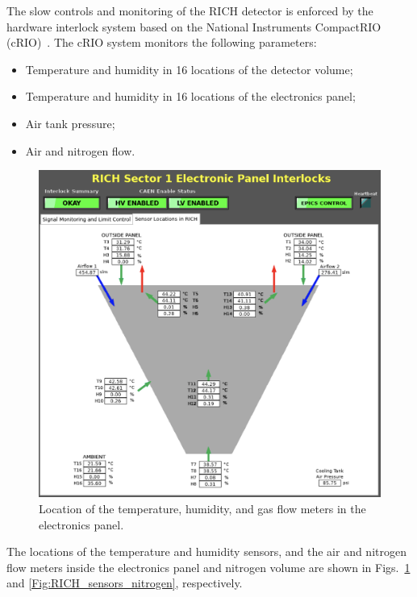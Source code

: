 \documentclass[5p,times,twocolumn]{elsarticle}
\begin{document}
The slow controls and monitoring of the RICH detector is enforced by the hardware interlock system based on the
National Instruments CompactRIO (cRIO)~\cite{Ref:cRIO}.
The cRIO system monitors the following parameters:
\begin{itemize}
\item Temperature and humidity in 16 locations of the detector volume;
\item Temperature and humidity in 16 locations of the electronics panel;
\item Air tank pressure;
\item Air and nitrogen flow. 
\end{itemize}
\begin{figure}
\begin{center}
\includegraphics[width=0.8\columnwidth]{RICH_sensors_e_panel.png}
\end{center}
\caption{Location of the temperature, humidity, and gas flow meters in the electronics panel.}
\label{Fig:RICH_sensors_e_panel}
\end{figure}
The locations of the temperature and humidity sensors, and the air and nitrogen flow meters inside the electronics
panel and nitrogen volume are shown in Figs.~\ref{Fig:RICH_sensors_e_panel} and \ref{Fig:RICH_sensors_nitrogen},
respectively.
\end{document}
